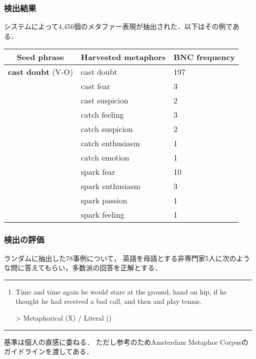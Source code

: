\documentclass[11pt]{beamer}
\newlength{\la}
\newcommand\thc[1]{\multicolumn{1}{c}{\textbf{#1}}}
\begin{document}
\begin{frame}
\frametitle{検出結果}

    システムによって4,456個のメタファー表現が抽出された．以下はその例である．
    \begingroup
    \scriptsize
    \begin{center}
        \begin{tabular}{lll}
        \toprule
        \thc{Seed phrase} &
            \thc{Harvested metaphors} &
            \thc{BNC frequency} \\
        \midrule
        \textbf{cast doubt} (V-O)   & cast doubt       & 197 \\
                                    & cast fear        & 3   \\
                                    & cast suspicion   & 2   \\
                                    & catch feeling    & 3   \\
                                    & catch suspicion  & 2   \\
                                    & catch enthusiasm & 1   \\
                                    & catch emotion    & 1   \\
                                    & spark fear       & 10   \\
                                    & spark enthusiasm & 3   \\
                                    & spark passion    & 1   \\
                                    & spark feeling    & 1   \\
        \bottomrule
        \end{tabular}
    \end{center}
    \endgroup
\end{frame}

\begin{frame}
\frametitle{検出の評価}
ランダムに抽出した78事例について，
英語を母語とする非専門家5人に次のような問に答えてもらい，多数派の回答を正解とする．

\rule{\textwidth}{1pt}
\vspace{-\topsep}
\begin{enumerate}
    \item Time and time again he would stare at the ground, hand on hip,
        if he thought he had received a bad call,
        and then 
        and play tennis.

    \textcolor{sBrown}{> Metaphorical (X) / Literal (\phantom{X})}
\end{enumerate}
\rule{\textwidth}{1pt}

基準は個人の直感に委ねる．
ただし参考のためAmsterdam Metaphor Corpusのガイドラインを渡してある．

\end{frame}
\end{document}
